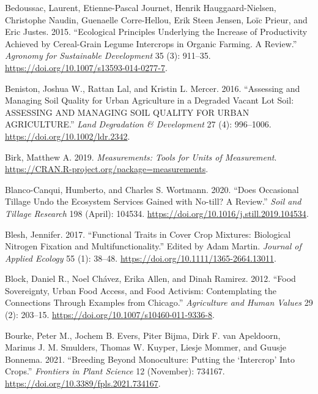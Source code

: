 \documentclass[
  12pt,
]{article}
\newlength{\cslhangindent}
\newlength{\cslentryspacingunit} %
\newenvironment{CSLReferences}[2] %
 {%
  \setlength{\parindent}{0pt}
  \ifodd #1
  \let\oldpar\par
  \def\par{\hangindent=\cslhangindent\oldpar}
  \fi
  \setlength{\parskip}{#2\cslentryspacingunit}
 }%
 {}
\begin{document}
\begin{CSLReferences}{1}{0}
\leavevmode{}%
Bedoussac, Laurent, Etienne-Pascal Journet, Henrik Hauggaard-Nielsen, Christophe Naudin, Guenaelle Corre-Hellou, Erik Steen Jensen, Loïc Prieur, and Eric Justes. 2015. {``Ecological Principles Underlying the Increase of Productivity Achieved by Cereal-Grain Legume Intercrops in Organic Farming. {A} Review.''} \emph{Agronomy for Sustainable Development} 35 (3): 911--35. \url{https://doi.org/10.1007/s13593-014-0277-7}.

\leavevmode{}%
Beniston, Joshua W., Rattan Lal, and Kristin L. Mercer. 2016. {``Assessing and {Managing Soil Quality} for {Urban Agriculture} in a {Degraded Vacant Lot Soil}: {ASSESSING AND MANAGING SOIL QUALITY FOR URBAN AGRICULTURE}.''} \emph{Land Degradation \& Development} 27 (4): 996--1006. \url{https://doi.org/10.1002/ldr.2342}.

\leavevmode{}%
Birk, Matthew A. 2019. \emph{Measurements: Tools for Units of Measurement}. \url{https://CRAN.R-project.org/package=measurements}.

\leavevmode{}%
Blanco-Canqui, Humberto, and Charles S. Wortmann. 2020. {``Does Occasional Tillage Undo the Ecosystem Services Gained with No-till? {A} Review.''} \emph{Soil and Tillage Research} 198 (April): 104534. \url{https://doi.org/10.1016/j.still.2019.104534}.

\leavevmode{}%
Blesh, Jennifer. 2017. {``Functional Traits in Cover Crop Mixtures: {Biological} Nitrogen Fixation and Multifunctionality.''} Edited by Adam Martin. \emph{Journal of Applied Ecology} 55 (1): 38--48. \url{https://doi.org/10.1111/1365-2664.13011}.

\leavevmode{}%
Block, Daniel R., Noel Chávez, Erika Allen, and Dinah Ramirez. 2012. {``Food Sovereignty, Urban Food Access, and Food Activism: Contemplating the Connections Through Examples from {Chicago}.''} \emph{Agriculture and Human Values} 29 (2): 203--15. \url{https://doi.org/10.1007/s10460-011-9336-8}.

\leavevmode{}%
Bourke, Peter M., Jochem B. Evers, Piter Bijma, Dirk F. van Apeldoorn, Marinus J. M. Smulders, Thomas W. Kuyper, Liesje Mommer, and Guusje Bonnema. 2021. {``Breeding {Beyond Monoculture}: {Putting} the {`{Intercrop}'} {Into Crops}.''} \emph{Frontiers in Plant Science} 12 (November): 734167. \url{https://doi.org/10.3389/fpls.2021.734167}.


\end{CSLReferences}
\end{document}
